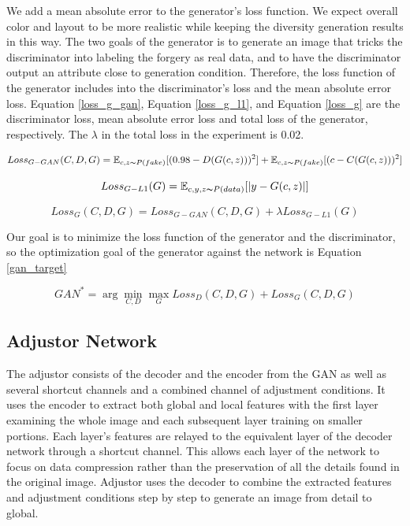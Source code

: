 We add a mean absolute error to the generator's loss function.
We expect overall color and layout to be more realistic while keeping the diversity generation results in this way.
The two goals of the generator is to generate an image that tricks the discriminator into labeling the forgery as real data,
    and to have the discriminator output an attribute close to generation condition.
Therefore, the loss function of the generator includes into the discriminator's loss and the mean absolute error loss.
Equation \eqref{loss_g_gan}, Equation \eqref{loss_g_l1}, and Equation \eqref{loss_g} are the discriminator loss,
    mean absolute error loss and total loss of the generator, respectively.
The $\lambda$ in the total loss in the experiment is 0.02.

\begin{equation}
    Loss_{G-GAN}(C,D,G)=
    \mathbb{E}_{c,z\thicksim P(fake)}[(0.98-D(G(c,z)))^2]+
    \mathbb{E}_{c,z\thicksim P(fake)}[(c-C(G(c,z)))^2]
    \label{loss_g_gan}
\end{equation}

\begin{equation}
    Loss_{G-L1}(G)=
    \mathbb{E}_{c,y,z\thicksim P(data)}[|y-G(c,z)|]
    \label{loss_g_l1}
\end{equation}

\begin{equation}
    Loss_{G}(C,D,G)=
    Loss_{G-GAN}(C,D,G)+
    \lambda Loss_{G-L1}(G)
    \label{loss_g}
\end{equation}

Our goal is to minimize the loss function of the generator and the discriminator,
    so the optimization goal of the generator against the network is Equation \eqref{gan_target}

\begin{equation}
    GAN^*=\arg \min_{C,D} \max_{G}Loss_{D}(C,D,G)+Loss_{G}(C,D,G)
    \label{gan_target}
\end{equation}


\subsection{Adjustor Network}
The adjustor consists of the decoder and the encoder from the GAN as well as several shortcut channels and a combined channel of adjustment conditions.
It uses the encoder to extract both global and local features with the first layer examining the whole image and each subsequent layer training on smaller portions.
Each layer’s features are relayed to the equivalent layer of the decoder network through a shortcut channel.
This allows each layer of the network to focus on data compression rather than the preservation of all the details found in the original image.
Adjustor uses the decoder to combine the extracted features and adjustment conditions step by step to generate an image from detail to global.

